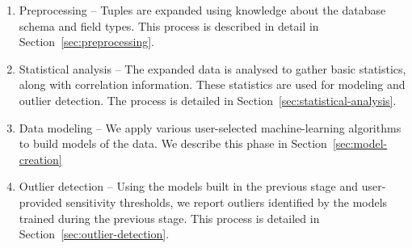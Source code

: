 \begin{enumerate}
\item Preprocessing -- Tuples are expanded using knowledge about the database schema and field types. This process is described in detail in Section~\ref{sec:preprocessing}.
\item Statistical analysis -- The expanded data is analysed to gather basic statistics, along with correlation information. These statistics are used for modeling and outlier detection. The process is detailed in Section~\ref{sec:statistical-analysis}.
\item Data modeling -- We apply various user-selected machine-learning algorithms to build models of the data. We describe this phase in Section~\ref{sec:model-creation}
\item Outlier detection -- Using the models built in the previous stage and user-provided sensitivity thresholds, we report outliers identified by the models trained during the previous stage. This process is detailed in Section~\ref{sec:outlier-detection}.
\end{enumerate}
